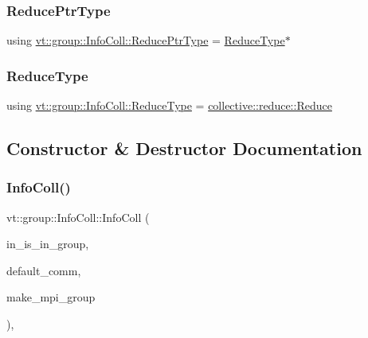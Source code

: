 \mbox{\label{structvt_1_1group_1_1_info_coll_a1b9fe0214f622ed9e8987531f44ef1fa}} 
\subsubsection{\texorpdfstring{Reduce\+Ptr\+Type}{ReducePtrType}}
{\footnotesize\ttfamily using \hyperlink{structvt_1_1group_1_1_info_coll_a1b9fe0214f622ed9e8987531f44ef1fa}{vt\+::group\+::\+Info\+Coll\+::\+Reduce\+Ptr\+Type} =  \hyperlink{structvt_1_1group_1_1_info_coll_a8376e2576e5e40b3c8059122bc96ec1b}{Reduce\+Type}$\ast$}

\mbox{\label{structvt_1_1group_1_1_info_coll_a8376e2576e5e40b3c8059122bc96ec1b}} 
\subsubsection{\texorpdfstring{Reduce\+Type}{ReduceType}}
{\footnotesize\ttfamily using \hyperlink{structvt_1_1group_1_1_info_coll_a8376e2576e5e40b3c8059122bc96ec1b}{vt\+::group\+::\+Info\+Coll\+::\+Reduce\+Type} =  \hyperlink{structvt_1_1collective_1_1reduce_1_1_reduce}{collective\+::reduce\+::\+Reduce}}



\subsection{Constructor \& Destructor Documentation}
\mbox{\label{structvt_1_1group_1_1_info_coll_a1181dfe3d01399d8e903d700461d2d7f}} 
\subsubsection{\texorpdfstring{Info\+Coll()}{InfoColl()}}
{\footnotesize\ttfamily vt\+::group\+::\+Info\+Coll\+::\+Info\+Coll (\begin{DoxyParamCaption}\item[{bool const}]{in\+\_\+is\+\_\+in\+\_\+group,  }\item[{M\+P\+I\+\_\+\+Comm}]{default\+\_\+comm,  }\item[{bool}]{make\+\_\+mpi\+\_\+group }\end{DoxyParamCaption})\hspace{0.3cm}{\ttfamily [inline]}, {\ttfamily [explicit]}}


